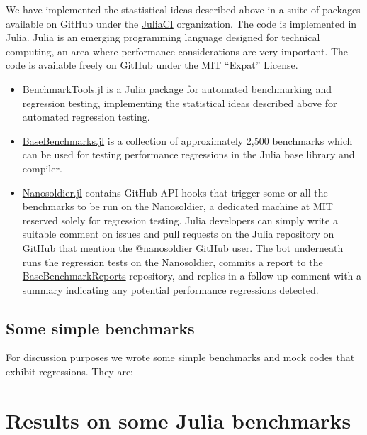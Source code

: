 \documentclass[conference]{IEEEtran}
\begin{document}
We have implemented the stastistical ideas described above in a suite of packages available on GitHub under the \href{https://github.com/JuliaCI}{JuliaCI} organization.
The code is implemented in Julia. Julia is an emerging programming language designed for technical computing, an area where performance considerations are very important.
The code is available freely on GitHub under the MIT ``Expat'' License.

\begin{itemize}

\item
\href{https://github.com/JuliaCI/BenchmarkTools.jl}{BenchmarkTools.jl}
is a Julia package for automated benchmarking and regression testing, implementing the statistical ideas described above for automated regression testing.

\item
\href{https://github.com/JuliaCI/BaseBenchmarks.jl}{BaseBenchmarks.jl}
is a collection of approximately 2,500 benchmarks which can be used for testing performance regressions in the Julia base library and compiler.

\item
\href{https://github.com/JuliaCI/Nanosoldier.jl}{Nanosoldier.jl}
contains GitHub API hooks that trigger some or all the benchmarks to be run on the Nanosoldier, a dedicated machine at MIT reserved solely for regression testing.
Julia developers can simply write a suitable comment on issues and pull requests on the Julia repository on GitHub that mention the \href{https://github.com/nanosoldier}{@nanosoldier} GitHub user. The bot underneath runs the regression tests on the Nanosoldier, commits a report to the \href{https://github.com/JuliaCI/BaseBenchmarkReports}{BaseBenchmarkReports} repository, and replies in a follow-up comment with a summary indicating any potential performance regressions detected.

\end{itemize}

\subsection{Some simple benchmarks}

For discussion purposes we wrote some simple benchmarks and mock codes that exhibit regressions. They are:




\section{Results on some Julia benchmarks}
\end{document}
